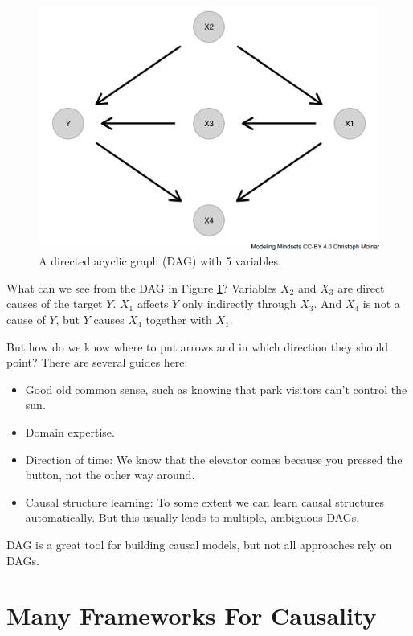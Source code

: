 \documentclass[
  10pt,
]{scrbook}
\providecommand{\tightlist}{%
  \setlength{\itemsep}{0pt}\setlength{\parskip}{0pt}}
\begin{document}
\begin{figure}

{\centering \includegraphics[width=\textwidth]{figures/dag-1} 

}

\caption{A directed acyclic graph (DAG) with 5 variables.}\label{fig:dag}
\end{figure}

What can we see from the DAG in Figure \ref{fig:dag}?
Variables \(X_2\) and \(X_3\) are direct causes of the target \(Y\).
\(X_1\) affects \(Y\) only indirectly through \(X_3\).
And \(X_4\) is not a cause of \(Y\), but \(Y\) causes \(X_4\) together with \(X_1\).

But how do we know where to put arrows and in which direction they should point?
There are several guides here:

\begin{itemize}
\tightlist
\item
  Good old common sense, such as knowing that park visitors can't control the sun.
\item
  Domain expertise.
\item
  Direction of time: We know that the elevator comes because you pressed the button, not the other way around.
\item
  Causal structure learning: To some extent we can learn causal structures automatically. But this usually leads to multiple, ambiguous DAGs.
\end{itemize}

DAG is a great tool for building causal models, but not all approaches rely on DAGs.

\hypertarget{many-frameworks-for-causality}{%
\section{Many Frameworks For Causality}\label{many-frameworks-for-causality}}
\end{document}
